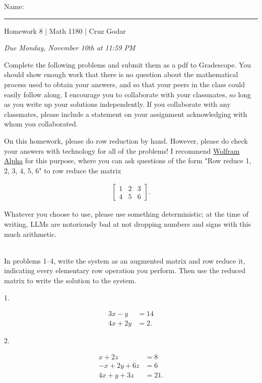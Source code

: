 \documentclass{article}
\begin{document}
\Large Name: \rule{2in}{0.15mm} \hfill Homework 8 | Math 1180 | Cruz Godar \vspace{4pt}  \normalsize

\textit{Due Monday, November 10th at 11:59 PM}

Complete the following problems and submit them as a pdf to Gradescope. You should show enough work that there is no question about the mathematical process used to obtain your answers, and so that your peers in the class could easily follow along. I encourage you to collaborate with your classmates, so long as you write up your solutions independently. If you collaborate with any classmates, please include a statement on your assignment acknowledging with whom you collaborated.

On this homework, please do row reduction by hand. However, please do check your answers with technology for all of the problems! I recommend \href{https://www.wolframalpha.com/}{Wolfram Alpha} for this purpose, where you can ask questions of the form "Row reduce {{1, 2, 3}, {4, 5, 6}}" to row reduce the matrix

\begin{align*}
	\left[\begin{array}{ccc} 1& 2& 3 \\ 4& 5& 6 \end{array}\right].
\end{align*}

Whatever you choose to use, please use something deterministic; at the time of writing, LLMs are notoriously bad at not dropping numbers and signs with this much arithmetic.

~\\

In problems 1--4, write the system as an augmented matrix and row reduce it, indicating every elementary row operation you perform. Then use the reduced matrix to write the solution to the system.

1.

\begin{align*}
	3x - y &= 14\\
	4x + 2y &= 2.
\end{align*}

2.

\begin{align*}
	x + 2z &= 8\\
	-x + 2y + 6z &= 6\\
	4x + y + 3z &= 21.
\end{align*}
\end{document}
